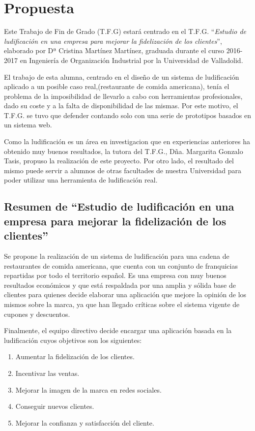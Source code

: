 \documentclass[twoside]{report}
\begin{document}
\section{Propuesta}
Este Trabajo de Fin de Grado (T.F.G) estará centrado en el T.F.G. \cite{cristinatfg} “\textit{Estudio de ludificación en una empresa para mejorar la fidelización de los clientes}”, elaborado por Dª Cristina Martínez Martínez, graduada durante el curso 2016-2017 en Ingeniería de Organización Industrial por la Universidad de Valladolid.  

El trabajo de esta alumna, centrado en el diseño de un sistema de ludificación aplicado a un posible caso real,(restaurante de comida americana), tenía el problema de la imposibilidad de llevarlo a cabo con herramientas profesionales, dado su coste y a la falta de disponibilidad de las mismas. Por este motivo, el T.F.G. se tuvo que defender contando solo con una serie de prototipos basados en un sistema web. 

Como la ludificación es un área en investigacion que en experiencias anteriores ha obtenido muy buenos resultados, la tutora del T.F.G., Dña. Margarita Gonzalo Tasis, propuso la realización de este proyecto. Por otro lado, el resultado del mismo puede servir a alumnos de otras facultades de nuestra Universidad para poder utilizar una herramienta de ludificación real.

\subsection{Resumen de “Estudio de ludificación en una empresa para mejorar la fidelización de los clientes”}

Se propone la realización de un sistema de ludificación para una cadena de restaurantes de comida americana, que cuenta con un conjunto de franquicias repartidas por todo el territorio español. Es una empresa con muy buenos resultados económicos y que está respaldada por una amplia y sólida base de clientes para quienes decide elaborar una aplicación que mejore la opinión de los mismos sobre la marca, ya que han llegado críticas sobre el sistema vigente de cupones y descuentos.

Finalmente, el equipo directivo decide encargar una aplicación basada en la ludificación cuyos objetivos son los siguientes:

\begin{enumerate}
\item Aumentar la fidelización de los clientes.
\item Incentivar las ventas.
\item Mejorar la imagen de la marca en redes sociales.
\item Conseguir nuevos clientes.
\item Mejorar la confianza y satisfacción del cliente. 
\end{enumerate}
\end{document}
